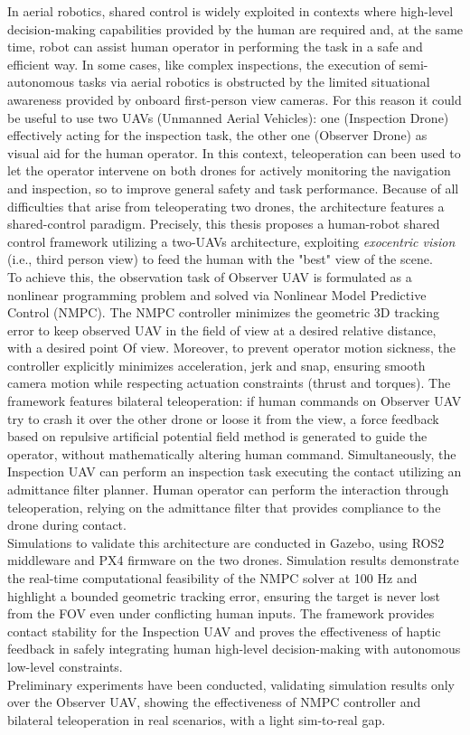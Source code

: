 \abstract
\justify
In aerial robotics, shared control is widely exploited in contexts where high-level decision-making capabilities provided by the human are required and, at the same time, robot can assist human operator in performing the task in a safe and efficient way. In some cases, like complex inspections, the execution of semi-autonomous tasks via aerial robotics is obstructed by the limited situational awareness provided by onboard first-person view cameras. For this reason it could be useful to use two UAVs (Unmanned Aerial Vehicles): one (Inspection Drone) effectively acting for the inspection task, the other one (Observer Drone) as visual aid for the human operator. In this context, teleoperation can been used to let the operator intervene on both drones for actively monitoring the navigation and inspection, so to improve general safety and task performance. Because of all difficulties that arise from teleoperating two drones, the architecture features a shared-control paradigm. Precisely, this thesis proposes a human-robot shared control framework utilizing a two-UAVs architecture, exploiting \textit{exocentric vision} (i.e., third person view) to feed the human with the "best" view of the scene.
\\To achieve this, the observation task of Observer UAV is formulated as a nonlinear programming problem and solved via Nonlinear Model Predictive Control (NMPC). The NMPC controller minimizes the geometric 3D tracking error to keep observed UAV in the field of view at a desired relative distance, with a desired point Of view. Moreover, to prevent operator motion sickness, the controller explicitly minimizes acceleration, jerk and snap, ensuring smooth camera motion while respecting actuation constraints (thrust and torques). The framework features bilateral teleoperation: if human commands on Observer UAV try to crash it over the other drone or loose it from the view, a force feedback based on repulsive artificial potential field method is generated to guide the operator, without mathematically altering human command. Simultaneously, the Inspection UAV can perform an inspection task executing the contact utilizing an admittance filter planner. Human operator can perform the interaction through teleoperation, relying on the admittance filter that provides compliance to the drone during contact. 
\\Simulations to validate this architecture are conducted in Gazebo, using ROS2 middleware and PX4 firmware on the two drones. Simulation results demonstrate the real-time computational feasibility of the NMPC solver at 100 Hz and highlight a bounded geometric tracking error, ensuring the target is never lost from the FOV even under conflicting human inputs. The framework provides contact stability for the Inspection UAV and proves the effectiveness of haptic feedback in safely integrating human high-level decision-making with autonomous low-level constraints. 
\\Preliminary experiments have been conducted, validating simulation results only  over the Observer UAV, showing the effectiveness of NMPC controller and bilateral teleoperation in real scenarios, with a light sim-to-real gap. 